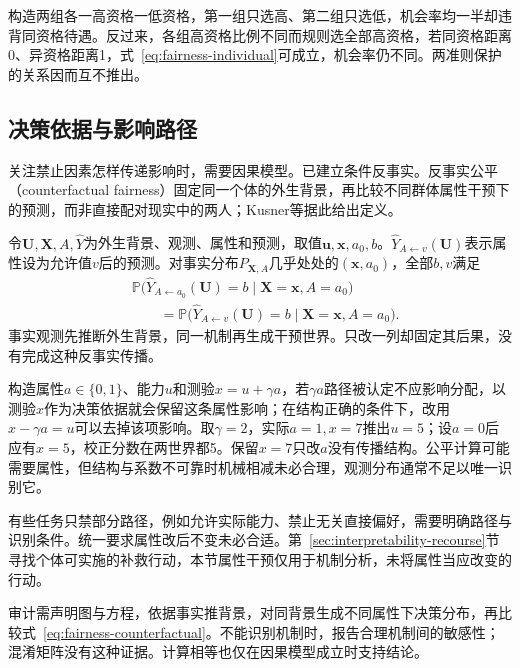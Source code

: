 构造两组各一高资格一低资格，第一组只选高、第二组只选低，机会率均一半却违背同资格待遇。反过来，各组高资格比例不同而规则选全部高资格，若同资格距离0、异资格距离1，式~\eqref{eq:fairness-individual}可成立，机会率仍不同。两准则保护的关系因而互不推出。

\subsection{决策依据与影响路径}
\label{sec:fairness-counterfactual-comparison}

关注禁止因素怎样传递影响时，需要因果模型。已建立条件反事实。反事实公平（counterfactual fairness）固定同一个体的外生背景，再比较不同群体属性干预下的预测，而非直接配对现实中的两人；Kusner等据此给出定义。

令$\bm U,\bm X,A,\hat Y$为外生背景、观测、属性和预测，取值$\bm u,\bm x,a_0,b$。$\hat Y_{A\leftarrow v}(\bm U)$表示属性设为允许值$v$后的预测。对事实分布$P_{\bm X,A}$几乎处处的$(\bm{x},a_0)$，全部$b,v$满足
\begin{equation}
\begin{aligned}
 &\mathbb P\bigl(\hat Y_{A\leftarrow a_0}(\bm U)=b
       \mid\bm X=\bm x,A=a_0\bigr)\\
 &\qquad=\mathbb P\bigl(\hat Y_{A\leftarrow v}(\bm U)=b
       \mid\bm X=\bm x,A=a_0\bigr).
\end{aligned}
 \label{eq:fairness-counterfactual}
\end{equation}
事实观测先推断外生背景，同一机制再生成干预世界。只改一列却固定其后果，没有完成这种反事实传播。

构造属性$a\in\{0,1\}$、能力$u$和测验$x=u+\gamma a$，若$\gamma a$路径被认定不应影响分配，以测验$x$作为决策依据就会保留这条属性影响；在结构正确的条件下，改用$x-\gamma a=u$可以去掉该项影响。取$\gamma=2$，实际$a=1,x=7$推出$u=5$；设$a=0$后应有$x=5$，校正分数在两世界都5。保留$x=7$只改$a$没有传播结构。公平计算可能需要属性，但结构与系数不可靠时机械相减未必合理，观测分布通常不足以唯一识别它。

有些任务只禁部分路径，例如允许实际能力、禁止无关直接偏好，需要明确路径与识别条件。统一要求属性改后不变未必合适。第~\ref{sec:interpretability-recourse}节寻找个体可实施的补救行动，本节属性干预仅用于机制分析，未将属性当应改变的行动。

审计需声明图与方程，依据事实推背景，对同背景生成不同属性下决策分布，再比较式~\eqref{eq:fairness-counterfactual}。不能识别机制时，报告合理机制间的敏感性；混淆矩阵没有这种证据。计算相等也仅在因果模型成立时支持结论。

